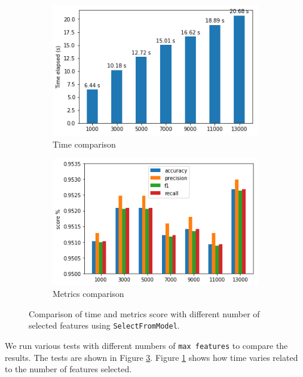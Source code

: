 \begin{figure}[]
	\centering
	\begin{subfigure}[t]{0.48\textwidth}
		\centering
		\includegraphics[width=\linewidth]{selmodel-time.png}
		\caption{Time comparison}\label{fig:model-time}		
	\end{subfigure}
	\begin{subfigure}[t]{0.48\textwidth}
		\centering
		\includegraphics[width=\linewidth]{selmodel-metrics.png}
		\caption{Metrics comparison}\label{fig:model-metrics}
	\end{subfigure}
	\caption{Comparison of time and metrics score with different number of selected features using \texttt{SelectFromModel}.}\label{fig:model}
\end{figure}


We run various tests with different numbers of \texttt{max	features} to compare the results. The tests are shown in Figure \ref{fig:model}. Figure \ref{fig:model-time} shows how time varies related to the number of features selected.

